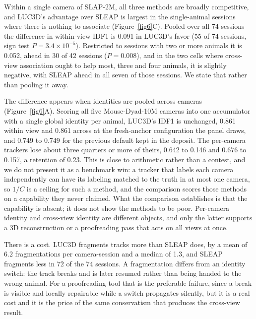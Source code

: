 \documentclass[pdflatex, sn-nature]{sn-jnl}
\theoremstyle{thmstyleone}%
\theoremstyle{thmstyletwo}%
\theoremstyle{thmstylethree}%
\begin{document}
Within a single camera of SLAP-2M, all three methods are broadly competitive, and LUC3D's advantage over SLEAP is largest in the single-animal sessions where there is nothing to associate (Figure~\ref{fig6}C). Pooled over all 74 sessions the difference in within-view IDF1 is 0.091 in LUC3D's favor (55 of 74 sessions, sign test $P = 3.4 \times 10^{-5}$). Restricted to sessions with two or more animals it is 0.052, ahead in 30 of 42 sessions ($P = 0.008$), and in the two cells where cross-view association ought to help most, three and four animals, it is slightly negative, with SLEAP ahead in all seven of those sessions. We state that rather than pooling it away.

The difference appears when identities are pooled across cameras (Figure~\ref{fig6}A). Scoring all five Mouse-Dyad-10M cameras into one accumulator with a single global identity per animal, LUC3D's IDF1 is unchanged, 0.861 within view and 0.861 across at the fresh-anchor configuration the panel draws, and 0.749 to 0.749 for the previous default kept in the deposit. The per-camera trackers lose about three quarters or more of theirs, 0.642 to 0.146 and 0.676 to 0.157, a retention of 0.23. This is close to arithmetic rather than a contest, and we do not present it as a benchmark win: a tracker that labels each camera independently can have its labeling matched to the truth in at most one camera, so $1/C$ is a ceiling for such a method, and the comparison scores those methods on a capability they never claimed. What the comparison establishes is that the capability is absent; it does not show the methods to be poor. Per-camera identity and cross-view identity are different objects, and only the latter supports a 3D reconstruction or a proofreading pass that acts on all views at once.

There is a cost. LUC3D fragments tracks more than SLEAP does, by a mean of 6.2 fragmentations per camera-session and a median of 1.3, and SLEAP fragments less in 72 of the 74 sessions. A fragmentation differs from an identity switch: the track breaks and is later resumed rather than being handed to the wrong animal. For a proofreading tool that is the preferable failure, since a break is visible and locally repairable while a switch propagates silently, but it is a real cost and it is the price of the same conservatism that produces the cross-view result.
\end{document}
